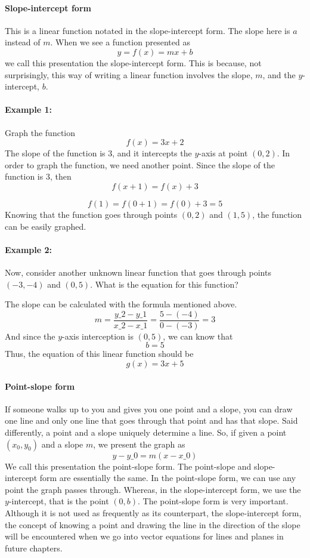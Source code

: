 \paragraph{Slope-intercept form}

This is a linear function notated in the slope-intercept form. The slope here is $a$ instead of $m$. When we see a function presented as
$$
y = f(x) = mx + b
$$
we call this presentation the slope-intercept form. This is because, not surprisingly, this way of writing a linear function involves the slope, $m$, and the $y$-intercept, $b$.

\paragraph{Example 1:}

Graph the function 
$$
f(x) = 3x + 2
$$
The slope of the function is 3, and it intercepts the $y$-axis at point $(0,2)$. In order to graph the function, we need another point. Since the slope of the function is 3, then
$$
f(x+1) = f(x) + 3
$$

$$
f(1) = f(0+1) = f(0) + 3 = 5
$$
Knowing that the function goes through points $(0,2)$ and $(1,5)$, the function can be easily graphed.

\paragraph{Example 2:}

Now, consider another unknown linear function that goes through points $(-3, -4)$ and $(0, 5)$. What is the equation for this function?

The slope can be calculated with the formula mentioned above.
$$
m = \frac{y\_2 - y\_1}{x\_2 - x\_1} = \frac{5 - (-4)}{0 - (-3)} = 3
$$
And since the $y$-axis interception is $(0,5)$, we can know that
$$
b = 5
$$
Thus, the equation of this linear function should be
$$
g(x) = 3x + 5
$$
\paragraph{Point-slope form}

If someone walks up to you and gives you one point and a slope, you can draw one line and only one line that goes through that point and has that slope. Said differently, a point and a slope uniquely determine a line. So, if given a point $(x_0, y_0)$ and a slope $m$, we present the graph as
$$
y - y\_0 = m(x - x\_0)
$$
We call this presentation the point-slope form. The point-slope and slope-intercept form are essentially the same. In the point-slope form, we can use any point the graph passes through. Whereas, in the slope-intercept form, we use the $y$-intercept, that is the point $(0, b)$. The point-slope form is very important. Although it is not used as frequently as its counterpart, the slope-intercept form, the concept of knowing a point and drawing the line in the direction of the slope will be encountered when we go into vector equations for lines and planes in future chapters.

